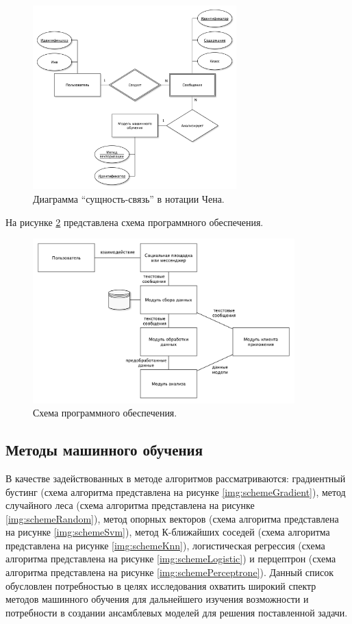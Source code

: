 \begin{figure}[H]
	\centering
	\includegraphics[width=0.7\textwidth]{inc/er.pdf}
	\caption{ Диаграмма ``сущность-связь'' в нотации Чена. }
	\label{img:er}
\end{figure}

На рисунке \ref{img:softScheme} представлена схема программного обеспечения.

\begin{figure}[H]
	\centering
	\includegraphics[width=0.9\textwidth]{inc/softScheme.pdf}
	\caption{ Схема программного обеспечения. }
	\label{img:softScheme}
\end{figure}


\subsection{Методы машинного обучения}

В качестве задействованных в методе алгоритмов рассматриваются: градиентный бустинг (схема алгоритма представлена на рисунке \ref{img:schemeGradient}), метод случайного леса (схема алгоритма представлена на рисунке \ref{img:schemeRandom}), метод опорных векторов (схема алгоритма представлена на рисунке \ref{img:schemeSvm}), метод К-ближайших соседей (схема алгоритма представлена на рисунке \ref{img:schemeKnn}), логистическая регрессия (схема алгоритма представлена на рисунке \ref{img:schemeLogistic}) и перцептрон (схема алгоритма представлена на рисунке \ref{img:schemePerceptrone}). Данный список обусловлен потребностью в целях исследования охватить широкий спектр методов машинного обучения для дальнейшего изучения возможности и потребности в создании ансамблевых моделей для решения поставленной задачи.

